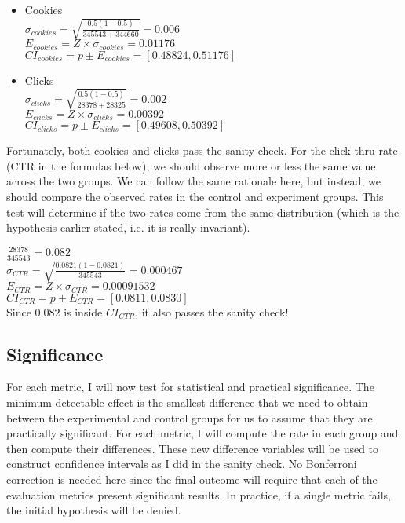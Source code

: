 \documentclass[11pt]{article}
\begin{document}
		\begin{itemize}
			\item Cookies\\
			$\sigma_{cookies} = \sqrt{\frac{0.5(1-0.5)}{345543+344660}} = 0.006$\\
			$E_{cookies} = Z \times \sigma_{cookies} = 0.01176$\\
			$CI_{cookies} = p \pm E_{cookies} = [0.48824, 0.51176]$
			\item Clicks\\
			$\sigma_{clicks} = \sqrt{\frac{0.5(1-0.5)}{28378+28325}} = 0.002$\\
			$E_{clicks} = Z \times \sigma_{clicks} = 0.00392$\\
			$CI_{clicks} = p \pm E_{clicks} = [0.49608, 0.50392]$
		\end{itemize}
	
		Fortunately, both cookies and clicks pass the sanity check.
		For the click-thru-rate (CTR in the formulas below), we should observe more or less the same value across the two groups.
		We can follow the same rationale here, but instead, we should compare the observed rates in the control and experiment groups.
		This test will determine if the two rates come from the same distribution (which is the hypothesis earlier stated, i.e. it is really invariant).
		 
		$\frac{28378}{345543} = 0.082$\\
		$\sigma_{CTR} = \sqrt{\frac{0.0821(1-0.0821)}{345543}} = 0.000467$\\
		$E_{CTR} = Z \times \sigma_{CTR} = 0.00091532$\\
		$CI_{CTR} = p \pm E_{CTR} = [0.0811, 0.0830]$\\
		
		Since $0.082$ is inside $CI_{CTR}$, it also passes the sanity check!
	
	\subsection{Significance}
	
		For each metric, I will now test for statistical and practical significance.
		The minimum detectable effect is the smallest difference that we need to obtain between the experimental and control groups for us to assume that they are practically significant.
		For each metric, I will compute the rate in each group and then compute their differences.
		These new difference variables will be used to construct confidence intervals as I did in the sanity check.
		No Bonferroni correction is needed here since the final outcome will require that each of the evaluation metrics present significant results.
		In practice, if a single metric fails, the initial hypothesis will be denied.
\end{document}
